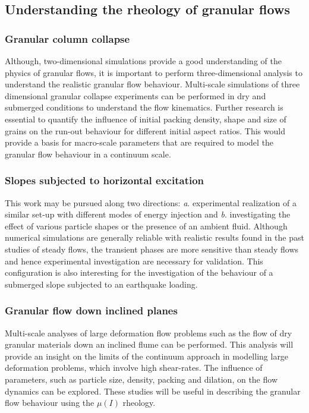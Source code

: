 \subsection{Understanding the rheology of granular flows}

\subsubsection*{Granular column collapse}
Although, two-dimensional simulations provide a good understanding of the 
physics of granular flows, it is important to perform three-dimensional 
analysis to understand the realistic granular flow behaviour. Multi-scale 
simulations of three dimensional granular collapse experiments can be performed 
in dry and submerged conditions to understand the flow kinematics. Further 
research is essential to quantify the influence of initial packing density, 
shape and size of grains on the run-out behaviour for different initial aspect 
ratios. This would provide a basis for macro-scale parameters that are required 
to model the granular flow behaviour in a continuum scale.

\subsubsection*{Slopes subjected to horizontal excitation}
This work may be pursued along two directions: \textit{a}. experimental 
realization of a similar set-up with different modes of energy injection and 
\textit{b}. investigating the effect of various particle shapes or the presence 
of an ambient fluid. Although numerical simulations are generally reliable with 
realistic results found in the past studies of steady flows, the transient 
phases are more sensitive than steady flows and hence experimental 
investigation are necessary for validation. This configuration is also 
interesting for the investigation of the behaviour of a submerged slope 
subjected to an earthquake loading.

\subsubsection*{Granular flow down inclined planes}

Multi-scale analyses of large deformation flow problems such as the flow of dry 
granular materials down an inclined flume can be performed. This analysis will 
provide an insight on the limits of the continuum approach in modelling large 
deformation problems, which involve high shear-rates. The influence of 
parameters, such as particle size, density, packing and dilation, on the flow 
dynamics can be explored. These studies will be useful in describing the 
granular flow behaviour using the $\mu(I)$ rheology.

